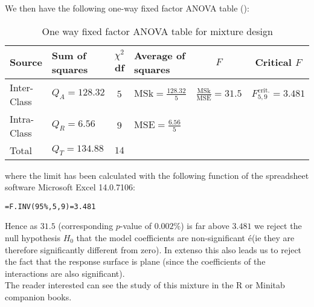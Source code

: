 	\begin{tcolorbox}[colframe=black,colback=white,sharp corners]
	We then have the following one-way fixed factor ANOVA table ():
	\begin{table}[H]\small
		\renewcommand{\arraystretch}{1.4}
		\begin{tabular}{llclcc}\hline
		Source & Sum of squares &  $\chi^2$ df & Average of squares & $F$ & Critical $F$\\ \hline
		Inter-Class & $Q_A=128.32$ & $5$ & $\text{MSk}=\displaystyle\frac{128.32}{5}$ &
		$\frac{\displaystyle\text{MSk}}{\displaystyle\text{MSE}}=31.5$ & $F_{5,9}^{\text{crit.}}=3.481$ \\
		Intra-Class & $Q_R=6.56$ & $9$ & $\text{MSE}=\displaystyle\frac{6.56}{5}$  & & \\
		Total & $Q_T=134.88$ & $14$ & & &\\ \hline
		\end{tabular}
		\caption[]{One way fixed factor ANOVA table for mixture design}
	\end{table}
	where the limit has been calculated with the following function of the spreadsheet software Microsoft Excel 14.0.7106:
	\begin{center}
		\texttt{=F.INV(95\%,5,9)=3.481}
	\end{center}
	Hence as $31.5$ (corresponding $p$-value of $0.002\%$) is far above $3.481$ we reject the null hypothesis $H_0$ that the model coefficients are non-significant é(ie they are therefore significantly different from zero). In extenso this also leads us to reject the fact that the response surface is plane (since the coefficients of the interactions are also significant).\\
	
	The reader interested can see the study of this mixture in the R or Minitab companion books.
	\end{tcolorbox}
	
	\pagebreak
